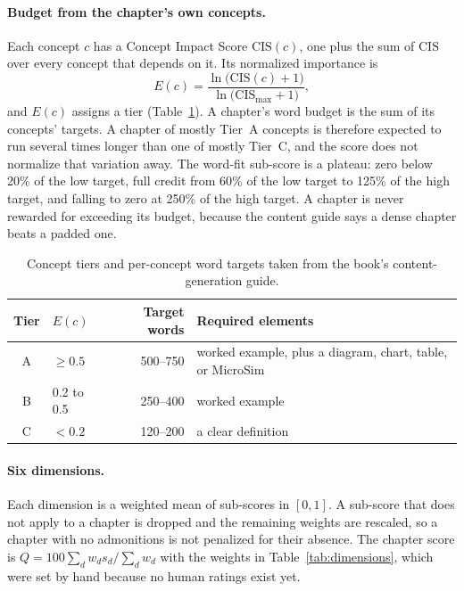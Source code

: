 \paragraph{Budget from the chapter's own concepts.}
Each concept $c$ has a Concept Impact Score $\mathrm{CIS}(c)$, one plus the sum of $\mathrm{CIS}$ over every concept that depends on it. Its normalized importance is
\begin{equation}
E(c) = \frac{\ln\bigl(\mathrm{CIS}(c)+1\bigr)}{\ln\bigl(\mathrm{CIS}_{\max}+1\bigr)},
\end{equation}
and $E(c)$ assigns a tier (Table~\ref{tab:tiers}). A chapter's word budget is the sum of its concepts' targets. A chapter of mostly Tier~A concepts is therefore expected to run several times longer than one of mostly Tier~C, and the score does not normalize that variation away. The word-fit sub-score is a plateau: zero below 20\% of the low target, full credit from 60\% of the low target to 125\% of the high target, and falling to zero at 250\% of the high target. A chapter is never rewarded for exceeding its budget, because the content guide says a dense chapter beats a padded one.

\begin{table}[htbp]
\centering
\small
\begin{tabular}{@{}clrl@{}}
\toprule
\textbf{Tier} & \textbf{$E(c)$} & \textbf{Target words} & \textbf{Required elements} \\
\midrule
A & $\ge 0.5$ & 500--750 & worked example, plus a diagram, chart, table, or MicroSim \\
B & 0.2 to 0.5 & 250--400 & worked example \\
C & $<0.2$ & 120--200 & a clear definition \\
\bottomrule
\end{tabular}
\caption{Concept tiers and per-concept word targets taken from the book's content-generation guide.}
\label{tab:tiers}
\end{table}

\paragraph{Six dimensions.}
Each dimension is a weighted mean of sub-scores in $[0,1]$. A sub-score that does not apply to a chapter is dropped and the remaining weights are rescaled, so a chapter with no admonitions is not penalized for their absence. The chapter score is $Q = 100\sum_d w_d s_d \big/ \sum_d w_d$ with the weights in Table~\ref{tab:dimensions}, which were set by hand because no human ratings exist yet.

